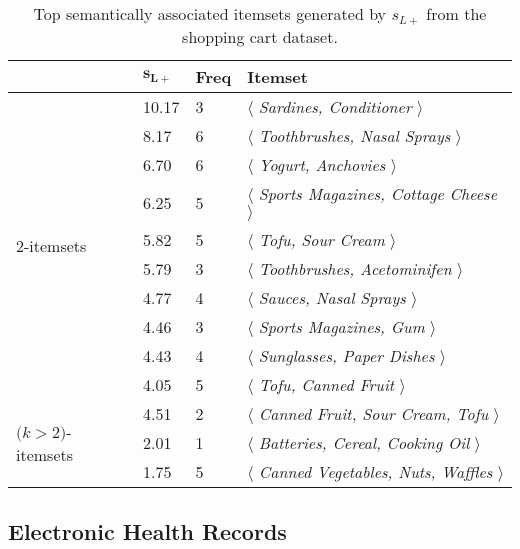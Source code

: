 \begin{table}
\begin{center}
\begin{tabular}{l|l| l | l }
  \hline
&$\mathbf{s_{L+}}$       &\textbf{Freq}&   \textbf{Itemset}\\
  \hline\hline
\multirow{10}{*}{2-itemsets}& 10.17	&	3	&$\langle$\emph{	Sardines,	Conditioner	}$\rangle$\\
&8.17	&	6	&$\langle$\emph{	Toothbrushes,	Nasal Sprays	}$\rangle$\\
&6.70	&	6	&$\langle$\emph{	Yogurt,	Anchovies	}$\rangle$\\
&6.25	&	5	&$\langle$\emph{	Sports Magazines,	Cottage Cheese	}$\rangle$\\
&5.82	&	5	&$\langle$\emph{	Tofu,	Sour Cream	}$\rangle$\\
&5.79	&	3	&$\langle$\emph{	Toothbrushes,	Acetominifen	}$\rangle$\\
&4.77	&	4	&$\langle$\emph{	Sauces,	Nasal Sprays	}$\rangle$\\
&4.46	&	3	&$\langle$\emph{	Sports Magazines,	Gum	}$\rangle$\\
&4.43	&	4	&$\langle$\emph{	Sunglasses,	Paper Dishes	}$\rangle$\\
&4.05	&	5	&$\langle$\emph{	Tofu,	Canned Fruit	}$\rangle$\\
  \hline
\multirow{3}{*}{\parbox{1cm}{$(k$$>$2$)$-itemsets}}&4.51	&	2	&$\langle$\emph{	Canned Fruit,	Sour Cream,	Tofu	 }$\rangle$\\
&2.01	&	1	&$\langle$\emph{	Batteries,	Cereal,	Cooking Oil	}$\rangle$\\
&1.75	&	5	&$\langle$\emph{	Canned Vegetables,	Nuts,	Waffles	}$\rangle$\\
\hline
\end{tabular}
\end{center}
\caption{\label{tbl:foodmart_pl} Top semantically associated itemsets generated by $s_{L+}$ from the shopping cart dataset.}
\end{table}

\subsection{Electronic Health Records}
